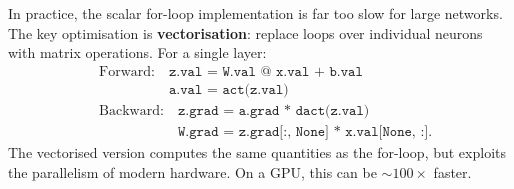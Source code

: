 In practice, the scalar for-loop implementation is far too slow for large networks. The key optimisation is \textbf{vectorisation}: replace loops over individual neurons with matrix operations. For a single layer:
\begin{align}
&\text{Forward:} \quad \texttt{z.val = W.val @ x.val + b.val} \nonumber\\
&\phantom{\text{Forward:} \quad} \texttt{a.val = act(z.val)} \nonumber\\
&\text{Backward:} \quad \texttt{z.grad = a.grad * dact(z.val)} \nonumber\\
&\phantom{\text{Backward:} \quad} \texttt{W.grad = z.grad[:, None] * x.val[None, :]}.
\end{align}
The vectorised version computes the same quantities as the for-loop, but exploits the parallelism of modern hardware. On a GPU, this can be $\sim\!100\times$ faster. 
